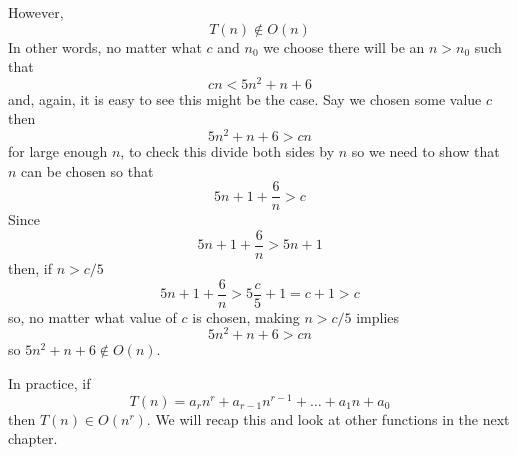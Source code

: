 \documentclass[11pt,a4paper]{scrartcl}
\begin{document}
However, 
\begin{equation}
T(n)\not\in O(n)
\end{equation}
In other words, no matter what $c$ and $n_0$ we choose there will be an $n>n_0$ such that
\begin{equation}
cn<5n^2+n+6
\end{equation}
and, again, it is easy to see this might be the case. Say we chosen
some value $c$ then
\begin{equation}
5n^2+n+6>cn
\end{equation}
for large enough $n$, to check this divide both sides by $n$ so we need to show that $n$ can be chosen so that
\begin{equation}
5n+1+\frac{6}{n}>c
\end{equation}
Since 
\begin{equation}
5n+1+\frac{6}{n}>5n+1
\end{equation}
then, if $n>c/5$
\begin{equation}
5n+1+\frac{6}{n}>5\frac{c}{5}+1=c+1>c
\end{equation}
so, no matter what value of $c$ is chosen, making $n>c/5$ implies
\begin{equation}
5n^2+n+6>cn
\end{equation}
so $5n^2+n+6\not\in O(n)$. 

In practice, if
\begin{equation}
T(n)=a_rn^r+a_{r-1}n^{r-1}+\ldots+a_1n+a_0
\end{equation}
then $T(n)\in O(n^r)$. We will recap this and look at other functions in the next chapter.
\end{document}
